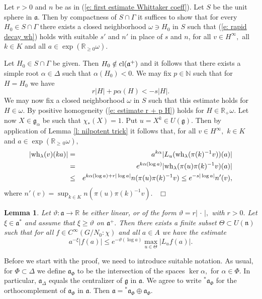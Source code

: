 \documentclass[12pt,a4paper]{article}
\newtheorem{Lemma}[Thm]{Lemma}
\newenvironment{lemma}[0]{\begin{Lemma}\noindent}%
{\end{Lemma}}
\def\proof{\par\noindent{\it Proof.}{\ }{\ }}
\def\qed{~\hfill\hbox{$\Box$}\medbreak}
\def\msy#1{{\mathbb #1}}
\def\N{{\msy N}}
\def\R{{\msy R}}
\def\ga{\alpha}
\def\gl{\lambda}
\def\gD{\Delta}
\def\got#1{\mathfrak #1}
\def\fa{{\got a}}
\def\fg{{\got g}}
\def\fn{{\got n}}
\def\to{\rightarrow}
\numberwithin{Thm}{section}
\numberwithin{equation}{section}
\def\dotvar{\, \cdot\,}
\numberwithin{equation}{section}
\def\fad{{\fa^*}}
\def\cl{{\rm cl}}
\def\wh{{\rm wh}}
\def\col{\!:\!}
\def\cchi{\chi}
\begin{document}
\proof 
Let $r > 0$ and $n$ be as in (\ref{e: first estimate Whittaker coeff}). 
Let $S$ be the unit sphere in $\fa$. Then by compactness of $S \cap \Gamma$ 
it suffices to show that for every $H_0 \in S\cap \Gamma$ there exists a closed neighborhood
$\omega \ni H_0$ in $S$ such that (\ref{e: rapid decay wh}) holds  with suitable $s' $ and $n'$ 
in place of $s$ and $n$, for all $v \in H^\infty,$ all $k \in K$ and all $a \in \exp(\R_{\geq 0} \omega).$ 

Let $H_0 \in S \cap \Gamma$ be given. Then $H_0\notin \cl(\fa^+)$ and it follows that there exists a simple root $\ga \in \gD$ 
such that $\ga(H_0) < 0.$ We may fix $p \in \N$ such that for $H = H_0$ 
we have
\begin{equation}
\label{e: estimate r + p H}
r|H| + p \ga(H) < - s|H|.
\end{equation} 
We may now fix a closed neighborhood $\omega$ in $S$ such that this estimate
holds for $H  \in \omega.$ By positive homogeneity (\ref{e: estimate r + p H})  holds for 
$H \in \R_+ \omega.$  Let now $X \in \fg_\ga$ be such that $\chi_*(X) = 1.$ 
Put $u = X^k \in U(\fg).$ Then by application of Lemma \ref{l: nilpotent trick} it follows that,
for all $v \in H^\infty,$ $k \in K$ and $a \in \exp (\R_{\geq\, 0} \omega),$ 
\begin{eqnarray*}
|\wh_\gl(v)(k a) |  & = & a^{k\ga} |L_u(\wh_\gl(\pi(k)^{-1}v))(a)| 
\\
&=& e^{k\ga(\log a)} |\wh_\gl(\pi(u)\pi(k)^{-1}v)(a)|\\
& \leq &  e^{k\ga(\log a) + r|\log a|} n (\pi(u) \pi(k)^{-1}v) \leq e^{-s|\log a|} n'(v),
\end{eqnarray*}
where $n' (v) = \sup_{k\in K} n ( \pi(u)\pi(k)^{-1} v).$ 
\qed


\begin{lemma}
\label{l: basic comparison of estimates}
Let $\vartheta: \fa \to \R$ be either linear, or of the form $\vartheta = r|\dotvar|,$  with $r> 0.$ 
Let $\xi \in \fad$ and assume that $\xi \geq  \vartheta$ on $\fa^+.$ 
Then there exists a finite subset $\Theta \subset U(\fn)$ 
such that for all $f \in C^\infty(G/N_0\col \cchi)$ and all $a\in A$ we have the estimate
\begin{equation}
\label{e: basic estimate f from exponent}
 a^{-\xi} |f(a)| \leq e^{-\vartheta(\log a)} \max_{u \in \Theta} |L_uf(a)|.
\end{equation}
\end{lemma}

Before we start with the proof, we need to introduce suitable notation. As usual, for $\Phi \subset \gD$ we define
$\fa_\Phi$ to be the intersection of the spaces $\ker \ga,$ for $\ga \in \Phi.$ 
In particular, $\fa_\gD$ equals the centralizer of $\fg$ in $\fa.$ We agree to 
write ${}^*\fa_\Phi$ for the orthocomplement of $\fa_\Phi $ in $\fa.$ Then 
$\fa = {}^*\fa_\Phi \oplus \fa_\Phi.$ 
\end{document}
